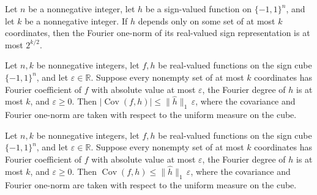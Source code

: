 \begin{theorem}
\label{FABL.fourierOneNorm_toReal_le_two_rpow_half_of_isKJunta}
\leanok
{}
Let $n$ be a nonnegative integer, let $h$ be a sign-valued function on $\{-1,1\}^n$,
and let $k$ be a nonnegative integer. If $h$ depends only on some set of at most $k$
coordinates, then the Fourier one-norm of its real-valued sign representation is at most
$2^{k/2}$.
\end{theorem}

\begin{theorem}
\label{FABL.IsLowDegreeFourierRegular.abs_covariance_le_fourierOneNorm_mul}
\leanok
{}
Let $n,k$ be nonnegative integers, let $f,h$ be real-valued functions on the sign cube
$\{-1,1\}^n$, and let $\varepsilon\in\mathbb R$. Suppose every nonempty set of at
most $k$ coordinates has Fourier coefficient of $f$ with absolute value at most
$\varepsilon$, the Fourier degree of $h$ is at most $k$, and $\varepsilon\ge 0$. Then
$|\operatorname{Cov}(f,h)|\le \|\widehat h\|_1\,\varepsilon$, where the
covariance and Fourier one-norm are taken with respect to the uniform measure on the
cube.
\end{theorem}

\begin{theorem}
\label{FABL.IsLowDegreeFourierRegular.covariance_le_fourierOneNorm_mul}
\leanok
{}
Let $n,k$ be nonnegative integers, let $f,h$ be real-valued functions on the sign cube
$\{-1,1\}^n$, and let $\varepsilon\in\mathbb R$. Suppose every nonempty set of at
most $k$ coordinates has Fourier coefficient of $f$ with absolute value at most
$\varepsilon$, the Fourier degree of $h$ is at most $k$, and $\varepsilon\ge0$. Then
$\operatorname{Cov}(f,h)\le \|\widehat h\|_1\,\varepsilon$, where the covariance
and Fourier one-norm are taken with respect to the uniform measure on the cube.
\end{theorem}

